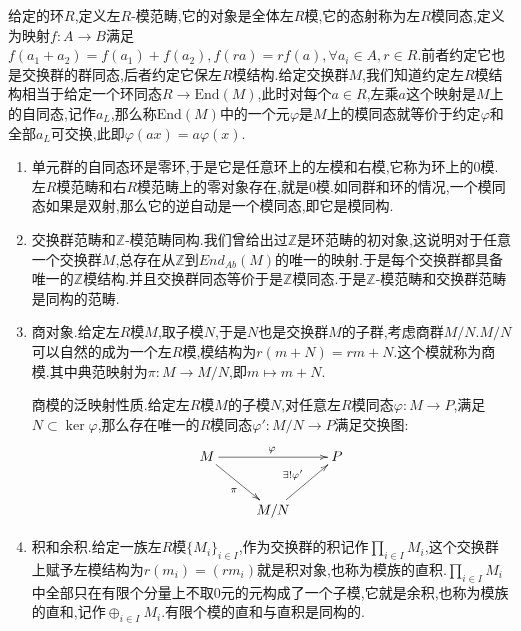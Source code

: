 给定的环$R$,定义左$R$-模范畴,它的对象是全体左$R$模,它的态射称为左$R$模同态,定义为映射$f:A\to B$满足$f(a_1+a_2)=f(a_1)+f(a_2),f(ra)=rf(a),\forall a_i\in A,r\in R$.前者约定它也是交换群的群同态,后者约定它保左$R$模结构.给定交换群$M$,我们知道约定左$R$模结构相当于给定一个环同态$R\to\mathrm{End}(M)$,此时对每个$a\in R$,左乘$a$这个映射是$M$上的自同态,记作$a_L$,那么称$\mathrm{End}(M)$中的一个元$\varphi$是$M$上的模同态就等价于约定$\varphi$和全部$a_L$可交换,此即$\varphi(ax)=a\varphi(x)$.
\begin{enumerate}
	\item 单元群的自同态环是零环,于是它是任意环上的左模和右模,它称为环上的0模.左$R$模范畴和右$R$模范畴上的零对象存在,就是0模.如同群和环的情况,一个模同态如果是双射,那么它的逆自动是一个模同态,即它是模同构.
	\item 交换群范畴和$\mathbb{Z}$-模范畴同构.我们曾给出过$\mathbb{Z}$是环范畴的初对象,这说明对于任意一个交换群$M$,总存在从$\mathbb{Z}$到$End_{Ab}(M)$的唯一的映射.于是每个交换群都具备唯一的$\mathbb{Z}$模结构.并且交换群同态等价于是$\mathbb{Z}$模同态.于是$\mathbb{Z}$-模范畴和交换群范畴是同构的范畴.
	\item 商对象.给定左$R$模$M$,取子模$N$,于是$N$也是交换群$M$的子群,考虑商群$M/N$.$M/N$可以自然的成为一个左$R$模,模结构为$r(m+N)=rm+N$.这个模就称为商模.其中典范映射为$\pi:M\to M/N$,即$m\mapsto m+N$.
	
	商模的泛映射性质.给定左$R$模$M$的子模$N$,对任意左$R$模同态$\varphi:M\to P$,满足$N\subset\ker\varphi$,那么存在唯一的$R$模同态$\varphi':M/N\to P$满足交换图:
	$$\xymatrix{
		M\ar[dr]_{\pi}\ar[rr]^{\varphi}&&P\\
		&M/N\ar[ur]^{\exists!\varphi'}&
	}$$
	\item 积和余积.给定一族左$R$模$\{M_i\}_{i\in I}$,作为交换群的积记作$\prod_{i\in I}M_i$,这个交换群上赋予左模结构为$r(m_i)=(rm_i)$就是积对象,也称为模族的直积.$\prod_{i\in I}M_i$中全部只在有限个分量上不取0元的元构成了一个子模,它就是余积,也称为模族的直和,记作$\oplus_{i\in I}M_i$.有限个模的直和与直积是同构的.
	

\end{enumerate}
